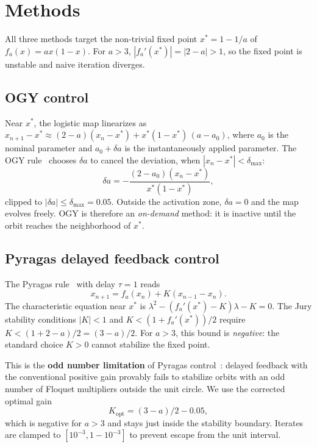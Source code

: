 \documentclass[aps,pre,twocolumn,superscriptaddress,nofootinbib,
               longbibliography,floatfix]{revtex4-2}
\newcommand{\xstar}{x^*}
\begin{document}
\section{Methods}
\label{sec:methods}

All three methods target the non-trivial fixed point
$\xstar = 1 - 1/a$ of $f_a(x) = ax(1-x)$.
For $a > 3$, $|f_a'(\xstar)| = |2 - a| > 1$, so the fixed
point is unstable and naive iteration diverges.

\subsection{OGY control}
\label{subsec:ogy}

Near $\xstar$, the logistic map linearizes as
$x_{n+1} - \xstar \approx (2-a)(x_n - \xstar) + \xstar(1-\xstar)\,(a-a_0)$,
where $a_0$ is the nominal parameter and $a_0 + \delta a$ is
the instantaneously applied parameter.
The OGY rule~\cite{OttGrebogiYorke1990} chooses $\delta a$ to
cancel the deviation, when $|x_n - \xstar| < \delta_{\max}$:
%
\begin{equation}
  \delta a = -\frac{(2-a_0)(x_n - \xstar)}{\xstar(1-\xstar)},
  \label{eq:ogy}
\end{equation}
%
clipped to $|\delta a| \leq \delta_{\max} = 0.05$.
Outside the activation zone, $\delta a = 0$ and the map
evolves freely.
OGY is therefore an \emph{on-demand} method: it is inactive
until the orbit reaches the neighborhood of $\xstar$.

\subsection{Pyragas delayed feedback control}
\label{subsec:pyragas}

The Pyragas rule~\cite{Pyragas1992} with delay $\tau = 1$ reads
%
\begin{equation}
  x_{n+1} = f_a(x_n) + K(x_{n-1} - x_n).
  \label{eq:pyragas}
\end{equation}
%
The characteristic equation near $\xstar$ is
$\lambda^2 - (f_a'(\xstar) - K)\lambda - K = 0$.
The Jury stability conditions
$|K| < 1$ and $K < (1 + f_a'(\xstar))/2$
require $K < (1 + 2 - a)/2 = (3-a)/2$.
For $a > 3$, this bound is \emph{negative}:
the standard choice $K > 0$ cannot stabilize the fixed point.

This is the \textbf{odd number limitation} of Pyragas
control~\cite{Nakajima1997,JustEtAl1997}: delayed feedback with
the conventional positive gain provably fails to stabilize
orbits with an odd number of Floquet multipliers outside the
unit circle.
We use the corrected optimal gain
%
\begin{equation}
  K_{\mathrm{opt}} = (3-a)/2 - 0.05,
  \label{eq:K-opt}
\end{equation}
%
which is negative for $a > 3$ and stays just inside the
stability boundary.
Iterates are clamped to $[10^{-3}, 1-10^{-3}]$ to prevent
escape from the unit interval.
\end{document}
